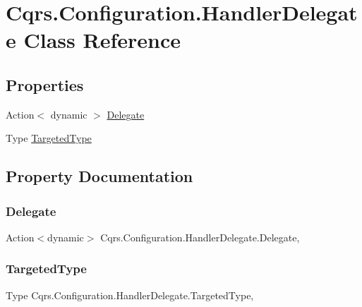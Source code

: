\hypertarget{classCqrs_1_1Configuration_1_1HandlerDelegate}{}\section{Cqrs.\+Configuration.\+Handler\+Delegate Class Reference}
\label{classCqrs_1_1Configuration_1_1HandlerDelegate}
\subsection*{Properties}
\begin{DoxyCompactItemize}
\item 
Action$<$ dynamic $>$ \hyperlink{classCqrs_1_1Configuration_1_1HandlerDelegate_a67fe9f218e3202af02319f33483edb20}{Delegate}
\item 
Type \hyperlink{classCqrs_1_1Configuration_1_1HandlerDelegate_ac88ee4620ae81fa214a562be2ce867f1}{Targeted\+Type}
\end{DoxyCompactItemize}


\subsection{Property Documentation}
\mbox{\label{classCqrs_1_1Configuration_1_1HandlerDelegate_a67fe9f218e3202af02319f33483edb20}} 
\subsubsection{\texorpdfstring{Delegate}{Delegate}}
{\footnotesize\ttfamily Action$<$dynamic$>$ Cqrs.\+Configuration.\+Handler\+Delegate.\+Delegate\hspace{0.3cm}{\ttfamily [get]}, {\ttfamily [set]}}

\mbox{\label{classCqrs_1_1Configuration_1_1HandlerDelegate_ac88ee4620ae81fa214a562be2ce867f1}} 
\subsubsection{\texorpdfstring{Targeted\+Type}{TargetedType}}
{\footnotesize\ttfamily Type Cqrs.\+Configuration.\+Handler\+Delegate.\+Targeted\+Type\hspace{0.3cm}{\ttfamily [get]}, {\ttfamily [set]}}

